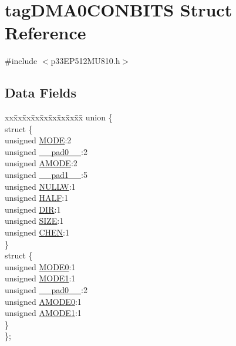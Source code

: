 \hypertarget{structtag_d_m_a0_c_o_n_b_i_t_s}{}\section{tag\+D\+M\+A0\+C\+O\+N\+B\+I\+TS Struct Reference}
\label{structtag_d_m_a0_c_o_n_b_i_t_s}


{\ttfamily \#include $<$p33\+E\+P512\+M\+U810.\+h$>$}

\subsection*{Data Fields}
\begin{DoxyCompactItemize}
\item 
\begin{tabbing}
xx\=xx\=xx\=xx\=xx\=xx\=xx\=xx\=xx\=\kill
union \{\\
\>struct \{\\
\>\>unsigned \hyperlink{structtag_d_m_a0_c_o_n_b_i_t_s_adc56ba18ff3f1599c85d222bee624424}{MODE}:2\\
\>\>unsigned \hyperlink{structtag_d_m_a0_c_o_n_b_i_t_s_adf71f3d8410c1f1dbbc96680a92c49af}{\_\_pad0\_\_}:2\\
\>\>unsigned \hyperlink{structtag_d_m_a0_c_o_n_b_i_t_s_ab3ff4e1f1b9a1037418ca7b6cb2e8f77}{AMODE}:2\\
\>\>unsigned \hyperlink{structtag_d_m_a0_c_o_n_b_i_t_s_acaf2d0924a107ec6e8d2e31febaf66f9}{\_\_pad1\_\_}:5\\
\>\>unsigned \hyperlink{structtag_d_m_a0_c_o_n_b_i_t_s_a1d3f7d04416314131889d1671a9287ad}{NULLW}:1\\
\>\>unsigned \hyperlink{structtag_d_m_a0_c_o_n_b_i_t_s_a1a715a64b2576f59401ac93d6f9a086a}{HALF}:1\\
\>\>unsigned \hyperlink{structtag_d_m_a0_c_o_n_b_i_t_s_ad6868749602045a76f36ffdf964dfd39}{DIR}:1\\
\>\>unsigned \hyperlink{structtag_d_m_a0_c_o_n_b_i_t_s_a5863cac6dc2cb330bdd0b1c66da70ffe}{SIZE}:1\\
\>\>unsigned \hyperlink{structtag_d_m_a0_c_o_n_b_i_t_s_a092934036fdfb8df5259db288fe438ca}{CHEN}:1\\
\>\} \\
\>struct \{\\
\>\>unsigned \hyperlink{structtag_d_m_a0_c_o_n_b_i_t_s_abc938903e74bff48935569d0c5b19035}{MODE0}:1\\
\>\>unsigned \hyperlink{structtag_d_m_a0_c_o_n_b_i_t_s_a7a9f7514566d0626724ce6c4b81b5ea2}{MODE1}:1\\
\>\>unsigned \hyperlink{structtag_d_m_a0_c_o_n_b_i_t_s_adf71f3d8410c1f1dbbc96680a92c49af}{\_\_pad0\_\_}:2\\
\>\>unsigned \hyperlink{structtag_d_m_a0_c_o_n_b_i_t_s_a0a1f894a2695c1388a5412244636805b}{AMODE0}:1\\
\>\>unsigned \hyperlink{structtag_d_m_a0_c_o_n_b_i_t_s_a3fde4abc0dc3db6fef6afc28c565ce3e}{AMODE1}:1\\
\>\} \\
\}; \\


\end{tabbing}
\end{DoxyCompactItemize}
